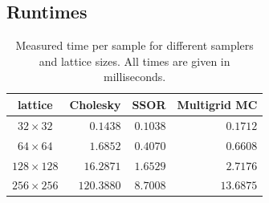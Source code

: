 \documentclass[11pt]{article}
\begin{document}
\subsection{Runtimes}
\begin{table}
    \begin{center}
        \begin{tabular}{crrr}
            \hline
            lattice         & \multicolumn{1}{c}{Cholesky} & \multicolumn{1}{c}{SSOR} & \multicolumn{1}{c}{Multigrid MC} \\
            \hline\hline
            $32\times 32$   & $0.1438$                     & $0.1038$                 & $0.1712$                         \\
            $64\times 64$   & $1.6852$                     & $0.4070$                 & $0.6608$                         \\
            $128\times 128$ & $16.2871$                    & $1.6529$                 & $2.7176$                         \\
            $256\times 256$ & $120.3880$                   & $8.7008$                 & $13.6875$                        \\
            \hline
        \end{tabular}
        \caption{Measured time per sample for different samplers and lattice sizes. All times are given in milliseconds.}
        \label{tab:runtimes}
    \end{center}
\end{table}
\end{document}
